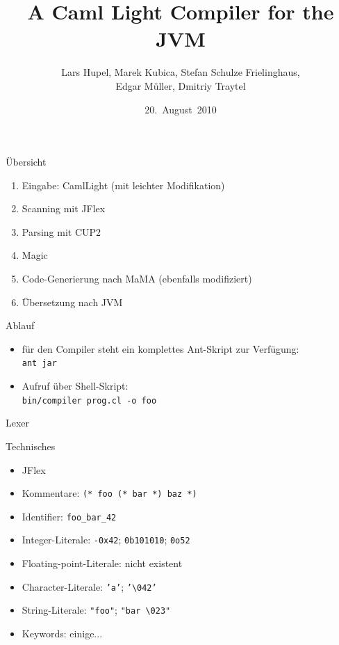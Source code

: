 \documentclass[hyperref={pdfpagelabels=false}]{beamer}
\title{A Caml Light Compiler for the JVM}
\author[Hupel, Kubica, Schulze Frielinghaus, Müller, Traytel]{Lars Hupel, Marek Kubica, Stefan Schulze Frielinghaus, \\Edgar Müller, Dmitriy Traytel}
\institute{TU~München}
\date{20.~August~2010}
\begin{document}
\frame{\titlepage}


\begin{frame}{Übersicht}
	\begin{enumerate}
		\item Eingabe: CamlLight (mit leichter Modifikation)
		\item Scanning mit JFlex
		\item Parsing mit CUP2
		\item Magic
		\item Code-Generierung nach MaMA (ebenfalls modifiziert)
		\item Übersetzung nach JVM
	\end{enumerate}
\end{frame}

\begin{frame}{Ablauf}
	\begin{itemize}
		\item für den Compiler steht ein komplettes Ant-Skript zur Verfügung:\\
			\texttt{ant jar}
		\item Aufruf über Shell-Skript:\\
			\texttt{bin/compiler prog.cl -o foo}
	\end{itemize}
\end{frame}

\begin{frame}{Lexer}
  \begin{block}{Technisches}
    \begin{itemize}
      \item JFlex
      \item Kommentare: \texttt{(* foo (* bar *) baz *)}
      \item Identifier: \texttt{foo\_bar\_42}
      \item Integer-Literale: \texttt{-0x42}; \texttt{0b101010}; \texttt{0o52}
      \item Floating-point-Literale: nicht existent
      \item Character-Literale: \texttt{'a'}; \texttt{'\textbackslash 042'}
      \item String-Literale: \texttt{"foo"}; \texttt{"bar \textbackslash 023"}
      \item Keywords: einige...
    \end{itemize}
  \end{block}
\end{frame}
\end{document}
